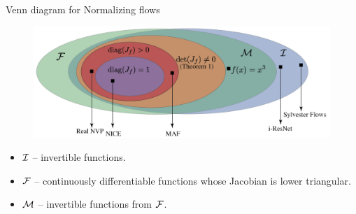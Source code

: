 \begin{frame}{Venn diagram for Normalizing flows}
	
	\begin{figure}
		\centering
		\includegraphics[width=\linewidth]{figs/venn_diagram}
	\end{figure}
	\begin{itemize}
		\item $\mathcal{I}$ -- invertible functions.
		\item $\mathcal{F}$ -- continuously differentiable functions whose Jacobian is lower triangular.
		\item $\mathcal{M}$ -- invertible functions from $\mathcal{F}$.
	\end{itemize}
\end{frame}
